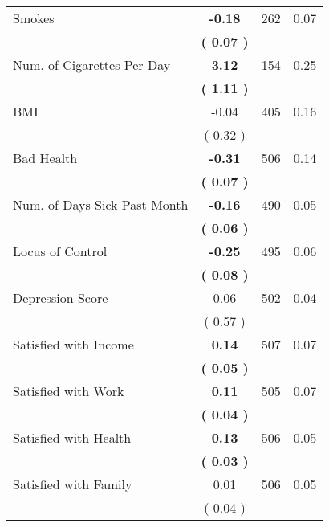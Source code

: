 \begin{tabular}{lccc}
Smokes & \textbf{    -0.18} & 262 &      0.07 \\ 
 & \textbf{(     0.07 )} & \\
Num. of Cigarettes Per Day & \textbf{     3.12} & 154 &      0.25 \\ 
 & \textbf{(     1.11 )} & \\
BMI &     -0.04 & 405 &      0.16 \\ 
 & (     0.32 ) & \\
Bad Health & \textbf{    -0.31} & 506 &      0.14 \\ 
 & \textbf{(     0.07 )} & \\
Num. of Days Sick Past Month & \textbf{    -0.16} & 490 &      0.05 \\ 
 & \textbf{(     0.06 )} & \\
Locus of Control & \textbf{    -0.25} & 495 &      0.06 \\ 
 & \textbf{(     0.08 )} & \\
Depression Score &      0.06 & 502 &      0.04 \\ 
 & (     0.57 ) & \\
Satisfied with Income & \textbf{     0.14} & 507 &      0.07 \\ 
 & \textbf{(     0.05 )} & \\
Satisfied with Work & \textbf{     0.11} & 505 &      0.07 \\ 
 & \textbf{(     0.04 )} & \\
Satisfied with Health & \textbf{     0.13} & 506 &      0.05 \\ 
 & \textbf{(     0.03 )} & \\
Satisfied with Family &      0.01 & 506 &      0.05 \\ 
 & (     0.04 ) & \\
\bottomrule
\end{tabular}
